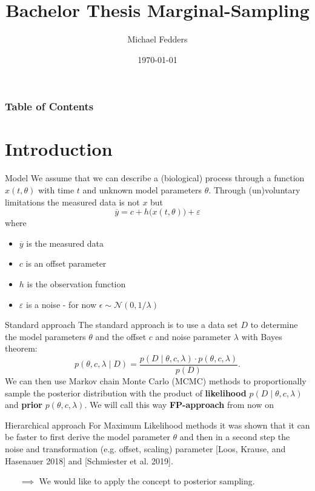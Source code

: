 \documentclass{beamer}
\title{Bachelor Thesis Marginal-Sampling}
\date{\today}
\author{Michael Fedders}
\begin{document}
	\maketitle
  	\begin{frame}[plain]
		\frametitle{Table of Contents}
		\tableofcontents
	\end{frame}
	
\section{Introduction}
	
	\begin{frame}{Model}
		We assume that we can describe a (biological) process through a function
		$x(t, \theta)$ with time $t$ and unknown model parameters $\theta$.
		Through (un)voluntary limitations the measured data is not $x$ but
		\[
			\overline{y} = c + h\bigl(x(t,\theta)\bigr) + \varepsilon
  		\]
		where
  		\begin{itemize}
  		\item $\overline{y}$ is the measured data
  		\item $c$ is an offset parameter
  		\item $h$ is the observation function
  		\item $\varepsilon$ is a noise - for now $\epsilon \sim \mathcal{N}(0, 
  		1/\lambda)$
  		\end{itemize}
	\end{frame}
	
	\begin{frame}{Standard approach}
		The standard approach is to use a data set $D$ to determine the model 
		parameters $\theta$ and the offset $c$ and noise parameter $\lambda$ with 			Bayes theorem:
		\[
			p(\theta,c,\lambda \mid D) = \frac{p(D \mid \theta,c,\lambda) \cdot
			p(\theta, c, \lambda)}{p(D)}.
		\]
		We can then use Markov chain Monte Carlo (MCMC) methods to proportionally 
		sample the posterior distribution with the product of \textbf{likelihood} 
		$p(D \mid \theta, c, \lambda)$ and \textbf{prior} $p(\theta, c, \lambda)$.
		We will call this way \textbf{FP-approach} from now on
	\end{frame}
	
	\begin{frame}{Hierarchical approach}
		For Maximum Likelihood methods it was shown that it can be faster to first 
		derive the model parameter $\theta$ and then in a second step the noise
		and transformation (e.g. offset, scaling) parameter [Loos, Krause, and
		 Hasenauer 2018] and [Schmiester et al. 2019].
		\begin{itemize}
			\item[$\implies$] We would like to apply the concept to posterior
			sampling. 
		\end{itemize}
	\end{frame}
	
\end{document}
